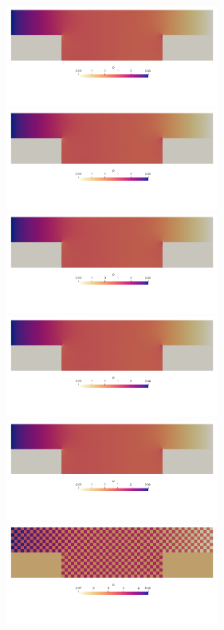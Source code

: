 \begin{center}
\includegraphics[width=7cm]{python_codes/fieldstone_78/results/flow_over_cavity/p2}
\includegraphics[width=7cm]{python_codes/fieldstone_78/results/flow_over_cavity/p3}\\
\includegraphics[width=7cm]{python_codes/fieldstone_78/results/flow_over_cavity/p4}
\includegraphics[width=7cm]{python_codes/fieldstone_78/results/flow_over_cavity/p5}\\
\includegraphics[width=7cm]{python_codes/fieldstone_78/results/flow_over_cavity/p6}
\includegraphics[width=7cm]{python_codes/fieldstone_78/results/flow_over_cavity/p7}
\end{center}

